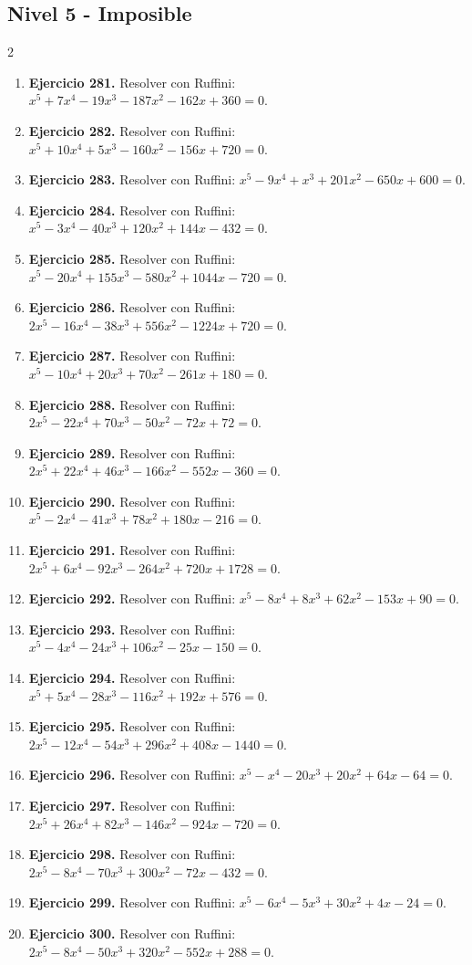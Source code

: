 \documentclass[10pt,a4paper]{article}
\newcommand{\nivel}[1]{\subsection*{#1}\addcontentsline{toc}{subsection}{#1}}
\begin{document}
\nivel{Nivel 5 - Imposible}
\begin{multicols}{2}
\begin{enumerate}[label=\textbf{\arabic*.}]
\item \textbf{Ejercicio 281.} Resolver con Ruffini: \(x^{5} + 7 x^{4} - 19 x^{3} - 187 x^{2} - 162 x + 360=0\).
\item \textbf{Ejercicio 282.} Resolver con Ruffini: \(x^{5} + 10 x^{4} + 5 x^{3} - 160 x^{2} - 156 x + 720=0\).
\item \textbf{Ejercicio 283.} Resolver con Ruffini: \(x^{5} - 9 x^{4} + x^{3} + 201 x^{2} - 650 x + 600=0\).
\item \textbf{Ejercicio 284.} Resolver con Ruffini: \(x^{5} - 3 x^{4} - 40 x^{3} + 120 x^{2} + 144 x - 432=0\).
\item \textbf{Ejercicio 285.} Resolver con Ruffini: \(x^{5} - 20 x^{4} + 155 x^{3} - 580 x^{2} + 1044 x - 720=0\).
\item \textbf{Ejercicio 286.} Resolver con Ruffini: \(2 x^{5} - 16 x^{4} - 38 x^{3} + 556 x^{2} - 1224 x + 720=0\).
\item \textbf{Ejercicio 287.} Resolver con Ruffini: \(x^{5} - 10 x^{4} + 20 x^{3} + 70 x^{2} - 261 x + 180=0\).
\item \textbf{Ejercicio 288.} Resolver con Ruffini: \(2 x^{5} - 22 x^{4} + 70 x^{3} - 50 x^{2} - 72 x + 72=0\).
\item \textbf{Ejercicio 289.} Resolver con Ruffini: \(2 x^{5} + 22 x^{4} + 46 x^{3} - 166 x^{2} - 552 x - 360=0\).
\item \textbf{Ejercicio 290.} Resolver con Ruffini: \(x^{5} - 2 x^{4} - 41 x^{3} + 78 x^{2} + 180 x - 216=0\).
\item \textbf{Ejercicio 291.} Resolver con Ruffini: \(2 x^{5} + 6 x^{4} - 92 x^{3} - 264 x^{2} + 720 x + 1728=0\).
\item \textbf{Ejercicio 292.} Resolver con Ruffini: \(x^{5} - 8 x^{4} + 8 x^{3} + 62 x^{2} - 153 x + 90=0\).
\item \textbf{Ejercicio 293.} Resolver con Ruffini: \(x^{5} - 4 x^{4} - 24 x^{3} + 106 x^{2} - 25 x - 150=0\).
\item \textbf{Ejercicio 294.} Resolver con Ruffini: \(x^{5} + 5 x^{4} - 28 x^{3} - 116 x^{2} + 192 x + 576=0\).
\item \textbf{Ejercicio 295.} Resolver con Ruffini: \(2 x^{5} - 12 x^{4} - 54 x^{3} + 296 x^{2} + 408 x - 1440=0\).
\item \textbf{Ejercicio 296.} Resolver con Ruffini: \(x^{5} - x^{4} - 20 x^{3} + 20 x^{2} + 64 x - 64=0\).
\item \textbf{Ejercicio 297.} Resolver con Ruffini: \(2 x^{5} + 26 x^{4} + 82 x^{3} - 146 x^{2} - 924 x - 720=0\).
\item \textbf{Ejercicio 298.} Resolver con Ruffini: \(2 x^{5} - 8 x^{4} - 70 x^{3} + 300 x^{2} - 72 x - 432=0\).
\item \textbf{Ejercicio 299.} Resolver con Ruffini: \(x^{5} - 6 x^{4} - 5 x^{3} + 30 x^{2} + 4 x - 24=0\).
\item \textbf{Ejercicio 300.} Resolver con Ruffini: \(2 x^{5} - 8 x^{4} - 50 x^{3} + 320 x^{2} - 552 x + 288=0\).
\end{enumerate}
\end{multicols}
\newpage
\end{document}
